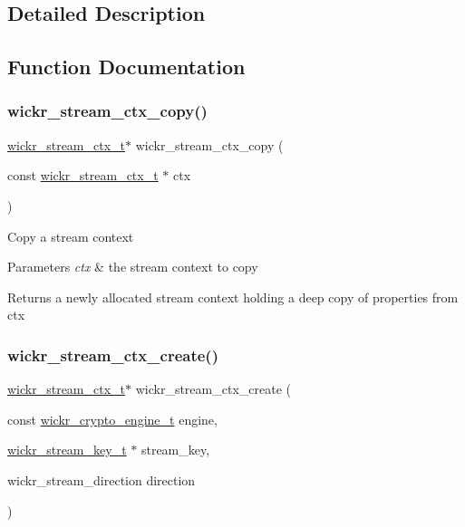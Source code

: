 \subsection{Detailed Description}


\subsection{Function Documentation}
\mbox{\label{group__wickr__stream_ga707b685e35eb437c33f5ec32c6760005}} 
\subsubsection{\texorpdfstring{wickr\_stream\_ctx\_copy()}{wickr\_stream\_ctx\_copy()}}
{\footnotesize\ttfamily \mbox{\hyperlink{structwickr__stream__ctx}{wickr\+\_\+stream\+\_\+ctx\+\_\+t}}$\ast$ wickr\+\_\+stream\+\_\+ctx\+\_\+copy (\begin{DoxyParamCaption}\item[{const \mbox{\hyperlink{structwickr__stream__ctx}{wickr\+\_\+stream\+\_\+ctx\+\_\+t}} $\ast$}]{ctx }\end{DoxyParamCaption})}

Copy a stream context


\begin{DoxyParams}{Parameters}
{\em ctx} & the stream context to copy \\
\hline
\end{DoxyParams}
\begin{DoxyReturn}{Returns}
a newly allocated stream context holding a deep copy of properties from \textquotesingle{}ctx\textquotesingle{} 
\end{DoxyReturn}
\mbox{\label{group__wickr__stream_ga0b5c513a3e0958dc7fd4f8455206e32e}} 
\subsubsection{\texorpdfstring{wickr\_stream\_ctx\_create()}{wickr\_stream\_ctx\_create()}}
{\footnotesize\ttfamily \mbox{\hyperlink{structwickr__stream__ctx}{wickr\+\_\+stream\+\_\+ctx\+\_\+t}}$\ast$ wickr\+\_\+stream\+\_\+ctx\+\_\+create (\begin{DoxyParamCaption}\item[{const \mbox{\hyperlink{structwickr__crypto__engine}{wickr\+\_\+crypto\+\_\+engine\+\_\+t}}}]{engine,  }\item[{\mbox{\hyperlink{structwickr__stream__key}{wickr\+\_\+stream\+\_\+key\+\_\+t}} $\ast$}]{stream\+\_\+key,  }\item[{wickr\+\_\+stream\+\_\+direction}]{direction }\end{DoxyParamCaption})}


